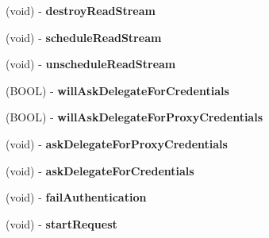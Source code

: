 \begin{DoxyCompactItemize}
\item 
\hypertarget{interface_a_s_i_h_t_t_p_request_07_08_ab3dbbd41ced7e54f058267aaa2e80150}{
(void) -\/ {\bfseries destroy\-Read\-Stream}}
\label{interface_a_s_i_h_t_t_p_request_07_08_ab3dbbd41ced7e54f058267aaa2e80150}

\item 
\hypertarget{interface_a_s_i_h_t_t_p_request_07_08_a9298c802e2cd503d0f3ae6f508f59e52}{
(void) -\/ {\bfseries schedule\-Read\-Stream}}
\label{interface_a_s_i_h_t_t_p_request_07_08_a9298c802e2cd503d0f3ae6f508f59e52}

\item 
\hypertarget{interface_a_s_i_h_t_t_p_request_07_08_a036ae593e23c948377acca2d405ab265}{
(void) -\/ {\bfseries unschedule\-Read\-Stream}}
\label{interface_a_s_i_h_t_t_p_request_07_08_a036ae593e23c948377acca2d405ab265}

\item 
\hypertarget{interface_a_s_i_h_t_t_p_request_07_08_a2fb19d10e5d6449c7845042add6dc2a1}{
(\-B\-O\-O\-L) -\/ {\bfseries will\-Ask\-Delegate\-For\-Credentials}}
\label{interface_a_s_i_h_t_t_p_request_07_08_a2fb19d10e5d6449c7845042add6dc2a1}

\item 
\hypertarget{interface_a_s_i_h_t_t_p_request_07_08_a52ecd8ea9d13c585c86a7f9031f1d2e8}{
(\-B\-O\-O\-L) -\/ {\bfseries will\-Ask\-Delegate\-For\-Proxy\-Credentials}}
\label{interface_a_s_i_h_t_t_p_request_07_08_a52ecd8ea9d13c585c86a7f9031f1d2e8}

\item 
\hypertarget{interface_a_s_i_h_t_t_p_request_07_08_a545869781fbd1e24ed126da754536006}{
(void) -\/ {\bfseries ask\-Delegate\-For\-Proxy\-Credentials}}
\label{interface_a_s_i_h_t_t_p_request_07_08_a545869781fbd1e24ed126da754536006}

\item 
\hypertarget{interface_a_s_i_h_t_t_p_request_07_08_a44501e22716b6373457e7f235775662c}{
(void) -\/ {\bfseries ask\-Delegate\-For\-Credentials}}
\label{interface_a_s_i_h_t_t_p_request_07_08_a44501e22716b6373457e7f235775662c}

\item 
\hypertarget{interface_a_s_i_h_t_t_p_request_07_08_aa65e69f36b090b963669094ce4e3ba31}{
(void) -\/ {\bfseries fail\-Authentication}}
\label{interface_a_s_i_h_t_t_p_request_07_08_aa65e69f36b090b963669094ce4e3ba31}

\item 
\hypertarget{interface_a_s_i_h_t_t_p_request_07_08_ae64756aed5b2103d48f7a10c04916c60}{
(void) -\/ {\bfseries start\-Request}}
\label{interface_a_s_i_h_t_t_p_request_07_08_ae64756aed5b2103d48f7a10c04916c60}


\end{DoxyCompactItemize}

